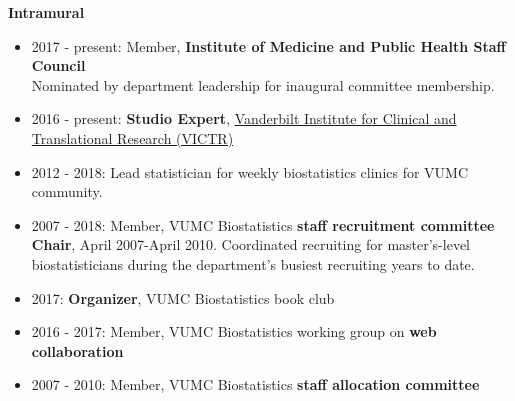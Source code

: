 \documentclass[5pt]{article}
\begin{document}
\noindent \textbf{Intramural}
\begin{itemize}
\item 2017 - present: Member, \textbf{Institute of Medicine and Public Health Staff Council}\\
\indent Nominated by department leadership for inaugural committee membership.
\item 2016 - present: \textbf{Studio Expert}, \href{https://victr.vanderbilt.edu/pub/message.html?message_id=141}{Vanderbilt Institute for Clinical and Translational Research (VICTR)}
\item 2012 - 2018: Lead statistician for weekly biostatistics clinics for VUMC community.
\item 2007 - 2018: Member, VUMC Biostatistics \textbf{staff recruitment committee}\\ \textbf{Chair}, April 2007-April 2010. Coordinated recruiting for master's-level biostatisticians during the department's busiest recruiting years to date.
\item 2017: \textbf{Organizer}, VUMC Biostatistics book club
\item 2016 - 2017: Member, VUMC Biostatistics working group on \textbf{web collaboration}
\item 2007 - 2010: Member, VUMC Biostatistics \textbf{staff allocation committee}
\end{itemize}
\end{document}
